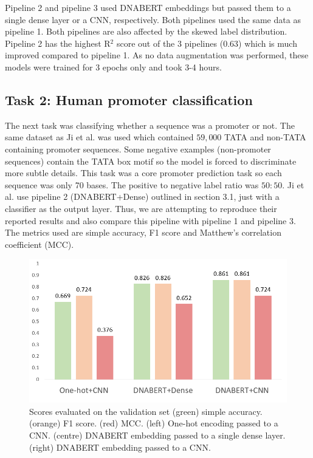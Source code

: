 \documentclass{article}
\begin{document}
Pipeline 2 and pipeline 3 used DNABERT embeddings but passed them to a single dense layer or a CNN, respectively. Both pipelines used the same data as pipeline 1. Both pipelines are also affected by the skewed label distribution. Pipeline 2 has the highest R$^2$ score out of the 3 pipelines ($0.63$) which is much improved compared to pipeline 1. As no data augmentation was performed, these models were trained for 3 epochs only and took 3-4 hours. 

\subsection{\textbf{Task 2:} Human promoter classification}
The next task was classifying whether a sequence was a promoter or not. The same dataset as Ji et al. \cite{dnabert2020} was used which contained $59,000$ TATA and non-TATA containing promoter sequences. Some negative examples (non-promoter sequences) contain the TATA box motif so the model is forced to discriminate more subtle details. This task was a core promoter prediction task so each sequence was only 70 bases. The positive to negative label ratio was $50:50$. Ji et al. \cite{dnabert2020} use pipeline 2 (DNABERT+Dense) outlined in section 3.1, just with a classifier as the output layer. Thus, we are attempting to reproduce their reported results and also compare this pipeline with pipeline 1 and pipeline 3. The metrics used are simple accuracy, F1 score and Matthew's correlation coefficient (MCC).

\begin{figure}[H]
    \centering
    \includegraphics[width=0.7\linewidth]{images/classification.png}
    \caption{Scores evaluated on the validation set (green) simple accuracy. (orange) F1 score. (red) MCC. (left) One-hot encoding passed to a CNN. (centre) DNABERT embedding passed to a single dense layer. (right) DNABERT embedding passed to a CNN. }
    \label{fig:classification}
\end{figure}
\end{document}
